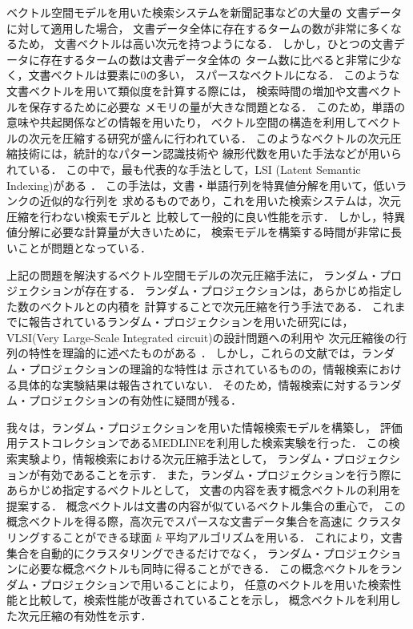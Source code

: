 ベクトル空間モデルを用いた検索システムを新聞記事などの大量の
文書データに対して適用した場合，
文書データ全体に存在するタームの数が非常に多くなるため，
文書ベクトルは高い次元を持つようになる．
しかし，ひとつの文書データに存在するタームの数は文書データ全体の
ターム数に比べると非常に少なく，文書ベクトルは要素に0の多い，
スパースなベクトルになる．
このような文書ベクトルを用いて類似度を計算する際には，
検索時間の増加や文書ベクトルを保存するために必要な
メモリの量が大きな問題となる．
このため，単語の意味や共起関係などの情報を用いたり，
ベクトル空間の構造を利用してベクトルの次元を圧縮する研究が盛んに行われている．
このようなベクトルの次元圧縮技術には，統計的なパターン認識技術や
線形代数を用いた手法などが用いられている\cite{Kolda}\cite{Faloutsos}．
この中で，最も代表的な手法として，LSI (Latent Semantic Indexing)がある
\cite{Deerwester}\cite{Dumais}．
この手法は，文書・単語行列を特異値分解を用いて，低いランクの近似的な行列を
求めるものであり，これを用いた検索システムは，次元圧縮を行わない検索モデルと
比較して一般的に良い性能を示す．
しかし，特異値分解に必要な計算量が大きいために，
検索モデルを構築する時間が非常に長いことが問題となっている．

上記の問題を解決するベクトル空間モデルの次元圧縮手法に，
ランダム・プロジェクション\cite{Arriaga}が存在する．
ランダム・プロジェクションは，あらかじめ指定した数のベクトルとの内積を
計算することで次元圧縮を行う手法である．
これまでに報告されているランダム・プロジェクションを用いた研究には，
VLSI(Very Large-Scale Integrated circuit)の設計問題への利用\cite{Vempala}や
次元圧縮後の行列の特性を理論的に述べたものがある
\cite{Papadimitriou}\cite{Arriaga}．
しかし，これらの文献では，ランダム・プロジェクションの理論的な特性は
示されているものの，情報検索における具体的な実験結果は報告されていない．
そのため，情報検索に対するランダム・プロジェクションの有効性に疑問が残る．

我々は，ランダム・プロジェクションを用いた情報検索モデルを構築し，
評価用テストコレクションであるMEDLINEを利用した検索実験を行った．
この検索実験より，情報検索における次元圧縮手法として，
ランダム・プロジェクションが有効であることを示す．
また，ランダム・プロジェクションを行う際にあらかじめ指定するベクトルとして，
文書の内容を表す概念ベクトル\cite{Dhillon}の利用を提案する．
概念ベクトルは文書の内容が似ているベクトル集合の重心で，
この概念ベクトルを得る際，高次元でスパースな文書データ集合を高速に
クラスタリングすることができる球面 $k$ 平均アルゴリズム\cite{Dhillon}を用いる．
これにより，文書集合を自動的にクラスタリングできるだけでなく，
ランダム・プロジェクションに必要な概念ベクトルも同時に得ることができる．
この概念ベクトルをランダム・プロジェクションで用いることにより，
任意のベクトルを用いた検索性能と比較して，検索性能が改善されていることを示し，
概念ベクトルを利用した次元圧縮の有効性を示す．

